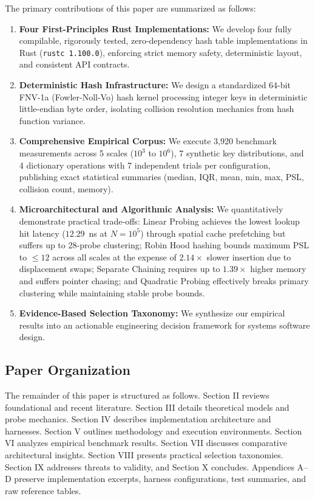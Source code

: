 \documentclass[conference]{IEEEtran}
\begin{document}
The primary contributions of this paper are summarized as follows:
\begin{enumerate}
  \item \textbf{Four First-Principles Rust Implementations:} We develop four fully compilable, rigorously tested, zero-dependency hash table implementations in Rust (\texttt{rustc 1.100.0}), enforcing strict memory safety, deterministic layout, and consistent API contracts.
  \item \textbf{Deterministic Hash Infrastructure:} We design a standardized 64-bit FNV-1a (Fowler-Noll-Vo) hash kernel processing integer keys in deterministic little-endian byte order, isolating collision resolution mechanics from hash function variance.
  \item \textbf{Comprehensive Empirical Corpus:} We execute 3,920 benchmark measurements across 5 scales ($10^3$ to $10^6$), 7 synthetic key distributions, and 4 dictionary operations with 7 independent trials per configuration, publishing exact statistical summaries (median, IQR, mean, min, max, PSL, collision count, memory).
  \item \textbf{Microarchitectural and Algorithmic Analysis:} We quantitatively demonstrate practical trade-offs: Linear Probing achieves the lowest lookup hit latency ($12.29$~ns at $N=10^5$) through spatial cache prefetching but suffers up to 28-probe clustering; Robin Hood hashing bounds maximum PSL to $\le 12$ across all scales at the expense of $2.14\times$ slower insertion due to displacement swaps; Separate Chaining requires up to $1.39\times$ higher memory and suffers pointer chasing; and Quadratic Probing effectively breaks primary clustering while maintaining stable probe bounds.
  \item \textbf{Evidence-Based Selection Taxonomy:} We synthesize our empirical results into an actionable engineering decision framework for systems software design.
\end{enumerate}

\subsection{Paper Organization}

The remainder of this paper is structured as follows. Section II reviews foundational and recent literature. Section III details theoretical models and probe mechanics. Section IV describes implementation architecture and harnesses. Section V outlines methodology and execution environments. Section VI analyzes empirical benchmark results. Section VII discusses comparative architectural insights. Section VIII presents practical selection taxonomies. Section IX addresses threats to validity, and Section X concludes. Appendices A--D preserve implementation excerpts, harness configurations, test summaries, and raw reference tables.
\end{document}
